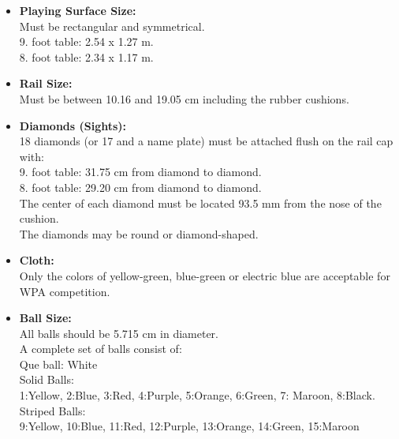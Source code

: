 \begin{itemize}
	\item \textbf{Playing Surface Size:}\\
		Must be rectangular and symmetrical.\\
		9. foot table: 2.54 x 1.27 m.\\
		8. foot table: 2.34 x 1.17 m.\\
	\item \textbf{Rail Size:}\\
		Must be between 10.16 and 19.05 cm including the rubber cushions.\\
	\item \textbf{Diamonds (Sights):}\\
		18 diamonds (or 17 and a name plate) must be attached flush on the rail cap with:\\
		9. foot table: 31.75 cm from diamond to diamond.\\
		8. foot table: 29.20 cm from diamond to diamond.\\
		The center of each diamond must be located 93.5 mm from the nose of the cushion.\\
		The diamonds may be round or diamond-shaped.\\
	\item \textbf{Cloth:}\\
		Only the colors of yellow-green, blue-green or electric blue are acceptable for WPA competition. \\
	\item \textbf{Ball Size:}\\
		All balls should be 5.715 cm in diameter.\\
		A complete set of balls consist of:\\
		Que ball: White\\
		Solid Balls:\\
		\hspace*{10 mm}	1:Yellow, 2:Blue, 3:Red, 4:Purple, 5:Orange, 6:Green, 7: Maroon, 8:Black.\\
		Striped Balls:\\
		\hspace*{10 mm}	9:Yellow, 10:Blue, 11:Red, 12:Purple, 13:Orange, 14:Green, 15:Maroon\\
		

\end{itemize}
